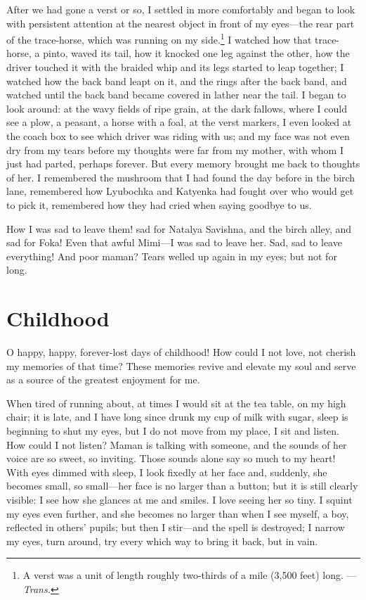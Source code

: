 After we had gone a verst or so, I settled in more comfortably and began to look with persistent attention at the nearest object in front of my eyes---the rear part of the trace-horse, which was running on my side.\footnote{A verst was a unit of length roughly two-thirds of a mile (3,500 feet) long. ---\textit{Trans.}} I watched how that trace-horse, a pinto, waved its tail, how it knocked one leg against the other, how the driver touched it with the braided whip and its legs started to leap together; I watched how the back band leapt on it, and the rings after the back band, and watched until the back band became covered in lather near the tail. I began to look around: at the wavy fields of ripe grain, at the dark fallows, where I could see a plow, a peasant, a horse with a foal, at the verst markers, I even looked at the coach box to see which driver was riding with us; and my face was not even dry from my tears before my thoughts were far from my mother, with whom I just had parted, perhaps forever. But every memory brought me back to thoughts of her. I remembered the mushroom that I had found the day before in the birch lane, remembered how Lyubochka and Katyenka had fought over who would get to pick it, remembered how they had cried when saying goodbye to us.

How I was sad to leave them! sad for Natalya Savishna, and the birch alley, and sad for Foka! Even that awful Mimi---I was sad to leave her. Sad, sad to leave everything! And poor maman? Tears welled up again in my eyes; but not for long.

\chapter{Childhood} %

O happy, happy, forever-lost days of childhood! How could I not love, not cherish my memories of that time? These memories revive and elevate my soul and serve as a source of the greatest enjoyment for me.

When tired of running about, at times I would sit at the tea table, on my high chair; it is late, and I have long since drunk my cup of milk with sugar, sleep is beginning to shut my eyes, but I do not move from my place, I sit and listen. How could I not listen? Maman is talking with someone, and the sounds of her voice are so sweet, so inviting. Those sounds alone say so much to my heart! With eyes dimmed with sleep, I look fixedly at her face and, suddenly, she becomes small, so small---her face is no larger than a button; but it is still clearly visible: I see how she glances at me and smiles. I love seeing her so tiny. I squint my eyes even further, and she becomes no larger than when I see myself, a boy, reflected in others' pupils; but then I stir---and the spell is destroyed; I narrow my eyes, turn around, try every which way to bring it back, but in vain.

